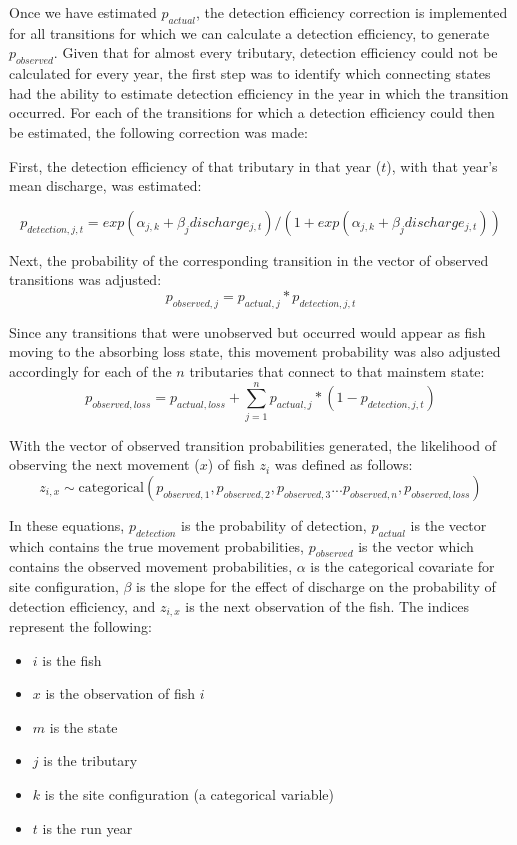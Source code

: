 \documentclass[
  12pt,
]{report}
\providecommand{\tightlist}{%
  \setlength{\itemsep}{0pt}\setlength{\parskip}{0pt}}
\begin{document}
Once we have estimated \(p_{actual}\), the detection efficiency
correction is implemented for all transitions for which we can calculate
a detection efficiency, to generate \(p_{observed}\). Given that for
almost every tributary, detection efficiency could not be calculated for
every year, the first step was to identify which connecting states had
the ability to estimate detection efficiency in the year in which the
transition occurred. For each of the transitions for which a detection
efficiency could then be estimated, the following correction was made:

First, the detection efficiency of that tributary in that year (\(t\)),
with that year's mean discharge, was estimated:

\[
p_{detection,j,t} = exp(\alpha_{j, k}  +  \beta_{j}  discharge_{j,t})/(1 + exp(\alpha_{j, k}  +  \beta_{j}  discharge_{j,t}))
\]

Next, the probability of the corresponding transition in the vector of
observed transitions was adjusted: \[
p_{observed,j} = p_{actual,j} * p_{detection,j,t}
\]

Since any transitions that were unobserved but occurred would appear as
fish moving to the absorbing loss state, this movement probability was
also adjusted accordingly for each of the \(n\) tributaries that connect
to that mainstem state: \[
p_{observed,loss} = p_{actual, loss} + \sum_{j=1}^{n} p_{actual,j} * (1 - p_{detection,j,t})
\]

With the vector of observed transition probabilities generated, the
likelihood of observing the next movement (\(x\)) of fish \(z_i\) was
defined as follows: \[
z_{i,x} \sim \text{categorical}(p_{observed,1}, p_{observed,2}, p_{observed,3} ... p_{observed, n}, p_{observed, loss})
\]

In these equations, \(p_{detection}\) is the probability of detection,
\(p_{actual}\) is the vector which contains the true movement
probabilities, \(p_{observed}\) is the vector which contains the
observed movement probabilities, \(\alpha\) is the categorical covariate
for site configuration, \(\beta\) is the slope for the effect of
discharge on the probability of detection efficiency, and \(z_{i,x}\) is
the next observation of the fish. The indices represent the following:

\begin{itemize}
\tightlist
\item
  \(i\) is the fish
\item
  \(x\) is the observation of fish \(i\)
\item
  \(m\) is the state
\item
  \(j\) is the tributary
\item
  \(k\) is the site configuration (a categorical variable)
\item
  \(t\) is the run year
\end{itemize}
\end{document}
